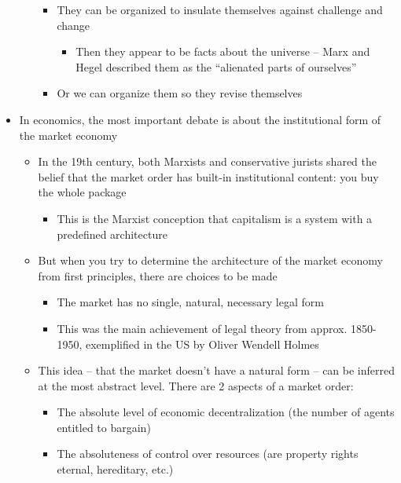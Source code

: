 \begin{itemize}
\begin{itemize}
    \begin{itemize}
    \tightlist
    \item
      They can be organized to insulate themselves against challenge and
      change

      \begin{itemize}
      \tightlist
      \item
        Then they appear to be facts about the universe -- Marx and
        Hegel described them as the ``alienated parts of ourselves''
      \end{itemize}
    \item
      Or we can organize them so they revise themselves
    \end{itemize}
  \end{itemize}
\item
  In economics, the most important debate is about the institutional
  form of the market economy

  \begin{itemize}
  \tightlist
  \item
    In the 19th century, both Marxists and conservative jurists shared
    the belief that the market order has built-in institutional content:
    you buy the whole package

    \begin{itemize}
    \tightlist
    \item
      This is the Marxist conception that capitalism is a system with a
      predefined architecture
    \end{itemize}
  \item
    But when you try to determine the architecture of the market economy
    from first principles, there are choices to be made

    \begin{itemize}
    \tightlist
    \item
      The market has no single, natural, necessary legal form
    \item
      This was the main achievement of legal theory from approx.
      1850-1950, exemplified in the US by Oliver Wendell Holmes
    \end{itemize}
  \item
    This idea -- that the market doesn't have a natural form -- can be
    inferred at the most abstract level. There are 2 aspects of a market
    order:

    \begin{itemize}
    \tightlist
    \item
      The absolute level of economic decentralization (the number of
      agents entitled to bargain)
    \item
      The absoluteness of control over resources (are property rights
      eternal, hereditary, etc.)


\end{itemize}
\end{itemize}
\end{itemize}
